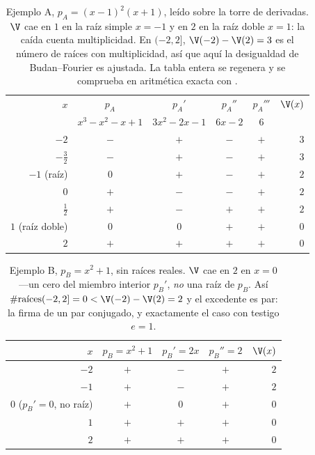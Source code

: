 \begin{table}[t]
\centering\small
{}
\begin{tabular}{@{}rccccr@{}}
\toprule
\rowcolor{ggteal!18}
$x$ & $p_A$ & $p_A'$ & $p_A''$ & $p_A'''$ & $\V(x)$ \\
    & {\scriptsize$x^3{-}x^2{-}x{+}1$} & {\scriptsize$3x^2{-}2x{-}1$} & {\scriptsize$6x{-}2$} & {\scriptsize$6$} & \\
\midrule
$-2$            & $-$ & $+$ & $-$ & $+$ & $3$ \\
$-\tfrac32$     & $-$ & $+$ & $-$ & $+$ & $3$ \\
$-1$ {\scriptsize(raíz)}        & $0$ & $+$ & $-$ & $+$ & $2$ \\
$0$             & $+$ & $-$ & $-$ & $+$ & $2$ \\
$\tfrac12$      & $+$ & $-$ & $+$ & $+$ & $2$ \\
$1$ {\scriptsize(raíz doble)}   & $0$ & $0$ & $+$ & $+$ & $0$ \\
$2$             & $+$ & $+$ & $+$ & $+$ & $0$ \\
\bottomrule
\end{tabular}
\caption{Ejemplo A, $p_A=(x-1)^2(x+1)$, leído sobre la torre de derivadas. $\V$ cae en $1$ en la
raíz simple $x=-1$ y en $2$ en la raíz doble $x=1$: la caída cuenta multiplicidad. En $(-2,2]$,
$\V(-2)-\V(2)=3$ es el número de raíces con multiplicidad, así que aquí la desigualdad de
Budan--Fourier es ajustada. La tabla entera se regenera y se comprueba en aritmética exacta con
.}
\label{tab:signsA}
\end{table}

\begin{table}[t]
\centering\small
{}
\begin{tabular}{@{}rcccr@{}}
\toprule
\rowcolor{ggteal!18}
$x$ & $p_B=x^2{+}1$ & $p_B'=2x$ & $p_B''=2$ & $\V(x)$ \\
\midrule
$-2$            & $+$ & $-$ & $+$ & $2$ \\
$-1$            & $+$ & $-$ & $+$ & $2$ \\
$0$ {\scriptsize($p_B'{=}0$, no raíz)} & $+$ & $0$ & $+$ & $0$ \\
$1$             & $+$ & $+$ & $+$ & $0$ \\
$2$             & $+$ & $+$ & $+$ & $0$ \\
\bottomrule
\end{tabular}
\caption{Ejemplo B, $p_B=x^2+1$, sin raíces reales. $\V$ cae en $2$ en $x=0$---un cero del miembro
interior $p_B'$, \emph{no} una raíz de $p_B$. Así $\#\text{raíces}(-2,2]=0<\V(-2)-\V(2)=2$ y el
excedente es par: la firma de un par conjugado, y exactamente el caso
 con testigo $e=1$.}
\label{tab:signsB}
\end{table}


